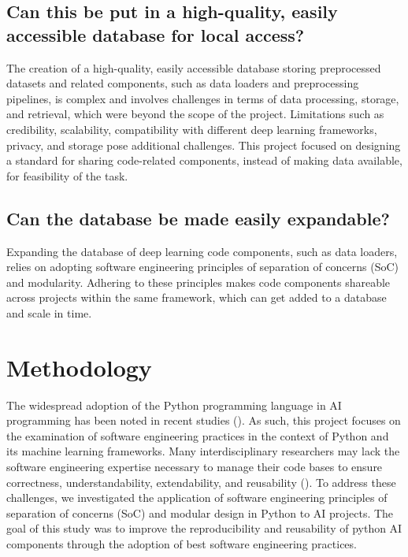 \documentclass{IEEEtran}
\begin{document}
\subsection{Can this be put in a high-quality, easily accessible database for local access?} {
The creation of a high-quality, easily accessible database storing preprocessed datasets and related components, such as data loaders and preprocessing pipelines, is complex and involves challenges in terms of data processing, storage, and retrieval, which were beyond the scope of the project. Limitations such as credibility, scalability, compatibility with different deep learning frameworks, privacy, and storage pose additional challenges. This project focused on designing a standard for sharing code-related components, instead of making data available, for feasibility of the task.
}

\subsection{Can the database be made easily expandable?} {
Expanding the database of deep learning code components, such as data loaders, relies on adopting software engineering principles of separation of concerns (SoC) and modularity. Adhering to these principles makes code components shareable across projects within the same framework, which can get added to a database and scale in time.
}

\section{Methodology}

The widespread adoption of the Python programming language in AI programming has been noted in recent studies (\cite{mihajlovic2020use,raschka2020machine}). As such, this project focuses on the examination of software engineering practices in the context of Python and its machine learning frameworks. Many interdisciplinary researchers may lack the software engineering expertise necessary to manage their code bases to ensure correctness, understandability, extendability, and reusability (\cite{amershi2019software,scully-debt-ml,leakage-recrisis,accountabilityInAi}). To address these challenges, we investigated the application of software engineering principles of separation of concerns (SoC) and modular design in Python to AI projects. The goal of this study was to improve the reproducibility and reusability of python AI components through the adoption of best software engineering practices.
\end{document}

